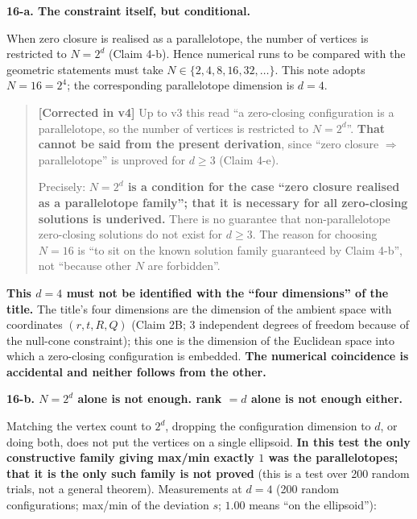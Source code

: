 \documentclass[
  10pt,
]{article}
\begin{document}
\textbf{16-a. The constraint itself, but conditional.}

When zero closure is realised as a parallelotope, the number of vertices
is restricted to \(N=2^d\) (Claim 4-b). Hence numerical runs to be
compared with the geometric statements must take
\(N\in\{2,4,8,16,32,\dots\}\). This note adopts \(N=16=2^4\); the
corresponding parallelotope dimension is \(d=4\).

\begin{quote}
\textbf{{[}Corrected in v4{]}} Up to v3 this read ``a zero-closing
configuration is a parallelotope, so the number of vertices is
restricted to \(N=2^d\)''. \textbf{That cannot be said from the present
derivation}, since ``zero closure \(\Rightarrow\) parallelotope'' is
unproved for \(d\ge3\) (Claim 4-e).

Precisely: \textbf{\(N=2^d\) is a condition for the case ``zero closure
realised as a parallelotope family''; that it is necessary for all
zero-closing solutions is underived.} There is no guarantee that
non-parallelotope zero-closing solutions do not exist for \(d\ge3\). The
reason for choosing \(N=16\) is ``to sit on the known solution family
guaranteed by Claim 4-b'', not ``because other \(N\) are forbidden''.
\end{quote}

\textbf{This \(d=4\) must not be identified with the ``four dimensions''
of the title.} The title's four dimensions are the dimension of the
ambient space with coordinates \((r,t,R,Q)\) (Claim 2B; 3 independent
degrees of freedom because of the null-cone constraint); this one is the
dimension of the Euclidean space into which a zero-closing configuration
is embedded. \textbf{The numerical coincidence is accidental and neither
follows from the other.}

\textbf{16-b. \(N=2^d\) alone is not enough. rank \(=d\) alone is not
enough either.}

Matching the vertex count to \(2^d\), dropping the configuration
dimension to \(d\), or doing both, does not put the vertices on a single
ellipsoid. \textbf{In this test the only constructive family giving
max/min exactly \(1\) was the parallelotopes; that it is the only such
family is not proved} (this is a test over 200 random trials, not a
general theorem). Measurements at \(d=4\) (200 random configurations;
max/min of the deviation \(s\); \(1.00\) means ``on the ellipsoid''):
\end{document}
